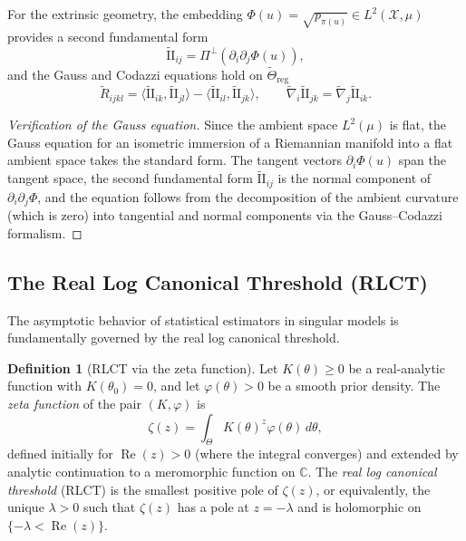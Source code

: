 \documentclass[11pt,letterpaper]{amsart}
\numberwithin{equation}{section}
\theoremstyle{plain}
\theoremstyle{definition}
\newtheorem{definition}[theorem]{Definition}
\theoremstyle{remark}
\begin{document}
For the extrinsic geometry, the embedding $\Phi(u) = \sqrt{p_{\pi(u)}} \in L^2(\mathcal{X},\mu)$ provides a second fundamental form
\[
\widetilde{\mathrm{II}}_{ij}
=
\Pi^\perp \left( \partial_i \partial_j \Phi(u) \right),
\]
and the Gauss and Codazzi equations hold on $\widetilde{\Theta}_{\mathrm{reg}}$
\[
\widetilde{R}_{ijkl}
=
\langle \widetilde{\mathrm{II}}_{ik}, \widetilde{\mathrm{II}}_{jl} \rangle
-
\langle \widetilde{\mathrm{II}}_{il}, \widetilde{\mathrm{II}}_{jk} \rangle,
\qquad
\widetilde{\nabla}_i \widetilde{\mathrm{II}}_{jk}
=
\widetilde{\nabla}_j \widetilde{\mathrm{II}}_{ik}.
\]

\begin{proof}[Verification of the Gauss equation]
Since the ambient space $L^2(\mu)$ is flat, the Gauss equation for an isometric immersion of a Riemannian manifold into a flat ambient space takes the standard form. The tangent vectors $\partial_i \Phi(u)$ span the tangent space, the second fundamental form $\widetilde{\mathrm{II}}_{ij}$ is the normal component of $\partial_i\partial_j\Phi$, and the equation follows from the decomposition of the ambient curvature (which is zero) into tangential and normal components via the Gauss--Codazzi formalism.
\end{proof}


\subsection{The Real Log Canonical Threshold (RLCT)}

The asymptotic behavior of statistical estimators in singular models is fundamentally governed by the real log canonical threshold.

\begin{definition}[RLCT via the zeta function]
\label{def:RLCT}
Let $K(\theta) \geq 0$ be a real-analytic function with $K(\theta_0) = 0$, and let $\varphi(\theta) > 0$ be a smooth prior density. The \emph{zeta function} of the pair $(K, \varphi)$ is
\[
\zeta(z) = \int_\Theta K(\theta)^z \varphi(\theta)\, d\theta,
\]
defined initially for $\operatorname{Re}(z) > 0$ (where the integral converges) and extended by analytic continuation to a meromorphic function on $\mathbb{C}$. The \emph{real log canonical threshold} (RLCT) is the smallest positive pole of $\zeta(z)$, or equivalently, the unique $\lambda > 0$ such that $\zeta(z)$ has a pole at $z = -\lambda$ and is holomorphic on $\{-\lambda < \operatorname{Re}(z)\}$.
\end{definition}
\end{document}
